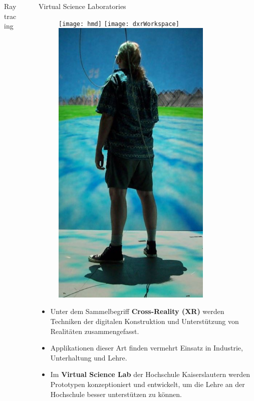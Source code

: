 \documentclass[final,hyperref={pdfpagelabels=false}]{beamer}
\begin{document}
\begin{frame}[t]
\begin{columns}[t]
\begin{column}{.465\textwidth}
\begin{block}{Raytracing}

\end{block}


\end{column}


\begin{column}{.025\textwidth}\end{column} %

\begin{column}{0.465\textwidth}

\begin{block}{Virtual Science Laboratories}
   \begin{figure}
   	  \texttt{[image: hmd]}\hspace*{0.25cm}
       \texttt{[image: dxrWorkspace]}
   	\includegraphics[height=14.25cm]{caveSlim}
   \end{figure}
   
   \begin{itemize}
   \item Unter dem Sammelbegriff \textbf{Cross-Reality (XR)} werden Techniken der digitalen Konstruktion und Unterst\"utzung von Realit\"aten zusammengefasst.
   \item Applikationen dieser Art finden vermehrt Einsatz in Industrie, Unterhaltung und Lehre.
   \item Im \textbf{Virtual Science Lab} der Hochschule Kaiserslautern werden Prototypen konzeptioniert und entwickelt, um die Lehre an der Hochschule besser unterst\"utzen zu k\"onnen.
   \end{itemize}
   

\end{block}
\end{column}
\end{columns}
\end{frame}
\end{document}
